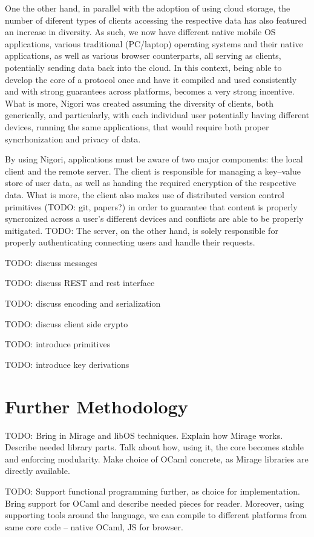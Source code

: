 One the other hand, in parallel with the adoption of using cloud storage, the number of diferent types of clients accessing the respective data has also featured an increase in diversity.
As such, we now have different native mobile OS applications, various traditional (PC/laptop) operating systems and their native applications, as well as various browser counterparts, all serving as clients, potentially sending data back into the cloud.
In this context, being able to develop the core of a protocol once and have it compiled and used consistently and with strong guarantees across platforms, becomes a very strong incentive.
What is more, Nigori was created assuming the diversity of clients, both generically, and particularly, with each individual user potentially having different devices, running the same applications, that would require both proper syncrhonization and privacy of data.

By using Nigori, applications must be aware of two major components: the local client and the remote server.
The client is responsible for managing a key--value store of user data, as well as handing the required encryption of the respective data.
What is more, the client also makes use of distributed version control primitives (TODO: git, papers?) in order to guarantee that content is properly syncronized across a user's different devices and conflicts are able to be properly mitigated.
TODO: The server, on the other hand, is solely responsible for properly authenticating connecting users and handle their requests.

TODO: discuss messages

TODO: discuss REST and rest interface

TODO: discuss encoding and serialization

TODO: discuss client side crypto

TODO: introduce primitives

TODO: introduce key derivations

\begin{comment}
Moreover, the login part of the protocol involved the user having one single password that would be used to derive the cryptographic keys needed for encryption and communication.
\end{comment}

\section{Further Methodology}
TODO: Bring in Mirage and libOS techniques. Explain how Mirage works. Describe needed library parts. Talk about how, using it, the core becomes stable and enforcing modularity. Make choice of OCaml concrete, as Mirage libraries are directly available.

TODO: Support functional programming further, as choice for implementation. Bring support for OCaml and describe needed pieces for reader. Moreover, using supporting tools around the language, we can compile to different platforms from same core code -- native OCaml, JS for browser.
